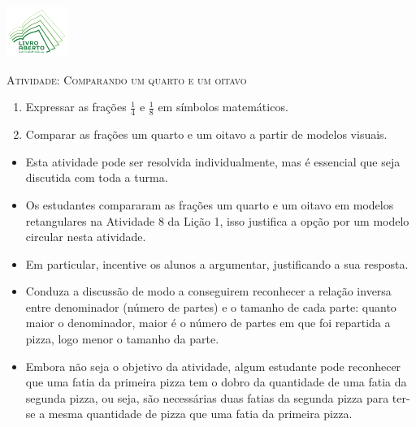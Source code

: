 \documentclass[10 pt,usenames,dvipsnames, oneside]{article}
\begin{document}
\begin{center}
  \begin{minipage}[l]{3cm}
\includegraphics[width=2cm]{../../../Figuras/logo}       
\end{minipage}\hfill
\begin{minipage}[r]{.8\textwidth}
 {\Large \scshape Atividade: Comparando um quarto e um oitavo}  
\end{minipage}
\end{center}
\vspace{.2cm}

\ifdefined\prof
\begin{goals}
\begin{enumerate}

  \item Expressar as frações $\frac{1}{4}$ e $\frac{1}{8}$ em símbolos matemáticos.
  \item Comparar as frações um quarto e um oitavo a partir de modelos visuais.

\end{enumerate}
\tcblower

\begin{itemize} %
    \item Esta atividade pode ser resolvida individualmente, mas é essencial que seja discutida com toda a turma.
    \item Os estudantes compararam as frações um quarto e um oitavo em modelos retangulares na Atividade 8 da Lição 1, isso justifica a opção por um modelo circular nesta atividade.
    \item Em particular, incentive os alunos a argumentar, justificando a sua resposta.
    \item Conduza a discussão de modo a conseguirem reconhecer a relação inversa entre denominador (número de partes) e o tamanho de cada parte: quanto maior o denominador, maior é o número de partes em que foi repartida a pizza, logo menor o tamanho da parte.
      \item Embora não seja o objetivo da atividade, algum estudante pode reconhecer que uma fatia da primeira pizza tem o dobro da quantidade de uma fatia da segunda  pizza, ou seja, são necessárias duas fatias da segunda pizza para ter-se a mesma quantidade de pizza que uma fatia da primeira pizza.
\end{itemize}

\end{goals}
\end{document}
